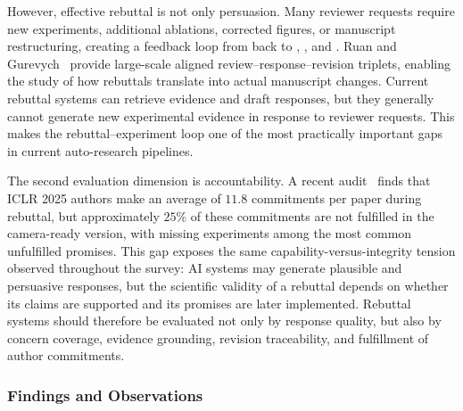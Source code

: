 \documentclass{llmxive}
\providecommand{\levelbadge}[2]{  \tcbox[on line, nobeforeafter, tcbox raise base,
         boxsep=0pt, left=2pt, right=2pt, top=0.5pt, bottom=0.5pt,
         arc=1.5pt, boxrule=0.3pt,
         colback=#1!15, colframe=#1!70]    {\scriptsize\bfseries\sffamily#2}}
\providecommand{\Sthree}{\texorpdfstring{\levelbadge{S3color}{S3}}{S3}\xspace}
\providecommand{\Sfour}{\texorpdfstring{\levelbadge{S4color}{S4}}{S4}\xspace}
\providecommand{\Sfive}{\texorpdfstring{\levelbadge{S5color}{S5}}{S5}\xspace}
\providecommand{\Sseven}{\texorpdfstring{\levelbadge{S7color}{S7}}{S7}\xspace}
\begin{document}
However, effective rebuttal is not only persuasion. Many reviewer requests require new experiments, additional ablations, corrected figures, or manuscript restructuring, creating a feedback loop from \Sseven back to \Sthree, \Sfour, and \Sfive. Ruan and Gurevych~\cite{ruan2026authorinloop} provide large-scale aligned review--response--revision triplets, enabling the study of how rebuttals translate into actual manuscript changes. Current rebuttal systems can retrieve evidence and draft responses, but they generally cannot generate new experimental evidence in response to reviewer requests. This makes the rebuttal--experiment loop one of the most practically important gaps in current auto-research pipelines.

The second evaluation dimension is accountability. A recent audit~\cite{rebuttalcommitment2026} finds that ICLR 2025 authors make an average of $11.8$ commitments per paper during rebuttal, but approximately $25\%$ of these commitments are not fulfilled in the camera-ready version, with missing experiments among the most common unfulfilled promises. This gap exposes the same capability-versus-integrity tension observed throughout the survey: AI systems may generate plausible and persuasive responses, but the scientific validity of a rebuttal depends on whether its claims are supported and its promises are later implemented. Rebuttal systems should therefore be evaluated not only by response quality, but also by concern coverage, evidence grounding, revision traceability, and fulfillment of author commitments.






\subsubsection{Findings and Observations}
\label{sec:s7_findings}
\end{document}
